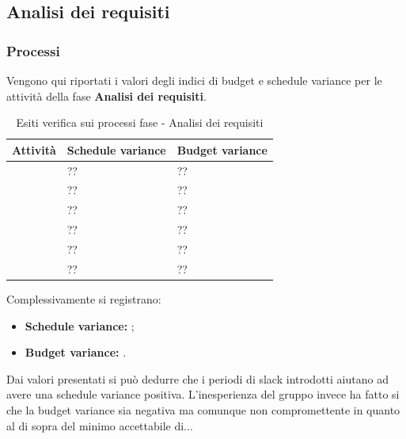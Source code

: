 	\subsection{Analisi dei requisiti}
			\subsubsection{Processi}
		Vengono qui riportati i valori degli indici di budget e schedule variance per le attività della fase \textbf{Analisi dei requisiti}.
			\begin{table}[!ht]
			\begin{center}
				\begin{tabularx}{0.9\textwidth}{|l|l|X|}
					\hline
					\textbf{Attività} & \textbf{Schedule variance} & \textbf{Budget variance}\\
					\hline						
					\docNameVersionAdR & ?? & ??\\
					\hline
					\docNameVersionGlo & ?? & ??\\
					\hline					
					\docNameVersionNdP & ?? & ??\\
					\hline					
					\docNameVersionPdP & ?? & ??\\
					\hline					
					\docNameVersionPdQ & ?? & ??\\
					\hline					
					\docNameVersionSdF & ?? & ??\\
					\hline				
				\end{tabularx}
			\end{center}
		\caption{Esiti verifica sui processi fase - Analisi dei requisiti}
	\end{table}
	Complessivamente si registrano:
	\begin{itemize}
	\item \textbf{Schedule variance:} ;
	\item \textbf{Budget variance:} .
	\end{itemize}
	Dai valori presentati si può dedurre che i periodi di slack introdotti aiutano ad avere una schedule variance positiva. L'inesperienza del gruppo invece ha fatto si che la budget variance sia negativa ma comunque non compromettente in quanto al di sopra del minimo accettabile di...
